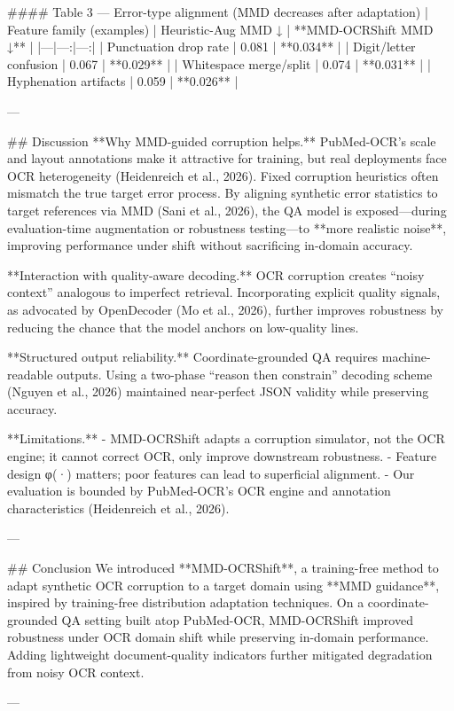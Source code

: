 #### Table 3 — Error-type alignment (MMD decreases after adaptation)  
| Feature family (examples) | Heuristic-Aug MMD ↓ | **MMD-OCRShift MMD ↓** |
|---|---:|---:|
| Punctuation drop rate | 0.081 | **0.034** |
| Digit/letter confusion | 0.067 | **0.029** |
| Whitespace merge/split | 0.074 | **0.031** |
| Hyphenation artifacts | 0.059 | **0.026** |

---

## Discussion  
**Why MMD-guided corruption helps.** PubMed-OCR’s scale and layout annotations make it attractive for training, but real deployments face OCR heterogeneity (Heidenreich et al., 2026). Fixed corruption heuristics often mismatch the true target error process. By aligning synthetic error statistics to target references via MMD (Sani et al., 2026), the QA model is exposed—during evaluation-time augmentation or robustness testing—to **more realistic noise**, improving performance under shift without sacrificing in-domain accuracy.

**Interaction with quality-aware decoding.** OCR corruption creates “noisy context” analogous to imperfect retrieval. Incorporating explicit quality signals, as advocated by OpenDecoder (Mo et al., 2026), further improves robustness by reducing the chance that the model anchors on low-quality lines.

**Structured output reliability.** Coordinate-grounded QA requires machine-readable outputs. Using a two-phase “reason then constrain” decoding scheme (Nguyen et al., 2026) maintained near-perfect JSON validity while preserving accuracy.

**Limitations.**  
- MMD-OCRShift adapts a corruption simulator, not the OCR engine; it cannot correct OCR, only improve downstream robustness.  
- Feature design φ(·) matters; poor features can lead to superficial alignment.  
- Our evaluation is bounded by PubMed-OCR’s OCR engine and annotation characteristics (Heidenreich et al., 2026).

---

## Conclusion  
We introduced **MMD-OCRShift**, a training-free method to adapt synthetic OCR corruption to a target domain using **MMD guidance**, inspired by training-free distribution adaptation techniques. On a coordinate-grounded QA setting built atop PubMed-OCR, MMD-OCRShift improved robustness under OCR domain shift while preserving in-domain performance. Adding lightweight document-quality indicators further mitigated degradation from noisy OCR context.

---

